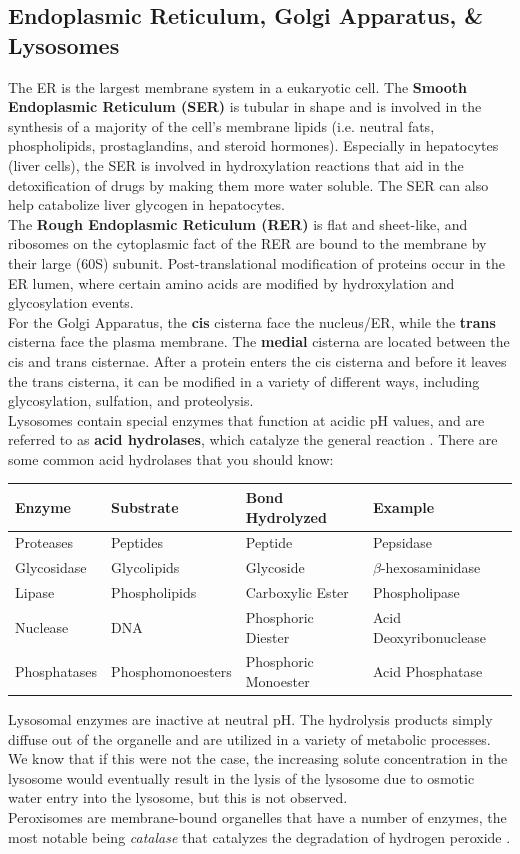 \documentclass{article}
\theoremstyle{plain}%
\theoremstyle{definition}
\theoremstyle{remark}
\begin{document}
\subsection{Endoplasmic Reticulum, Golgi Apparatus, \& Lysosomes}
The ER is the largest membrane system in a eukaryotic cell. The \textbf{Smooth Endoplasmic Reticulum (SER)} is tubular in shape and is involved in the synthesis of a majority of the cell's membrane lipids (i.e. neutral fats, phospholipids, prostaglandins, and steroid hormones). Especially in hepatocytes (liver cells), the SER is involved in hydroxylation reactions that aid in the detoxification of drugs by making them more water soluble. The SER can also help catabolize liver glycogen in hepatocytes.\\
\indent The \textbf{Rough Endoplasmic Reticulum (RER)} is flat and sheet-like, and ribosomes on the cytoplasmic fact of the RER are bound to the membrane by their large (60S) subunit. Post-translational modification of proteins occur in the ER lumen, where certain amino acids are modified by hydroxylation and glycosylation events. \\
\indent For the Golgi Apparatus, the \textbf{cis} cisterna face the nucleus/ER, while the \textbf{trans} cisterna face the plasma membrane. The \textbf{medial} cisterna are located between the cis and trans cisternae. After a protein enters the cis cisterna and before it leaves the trans cisterna, it can be modified in a variety of different ways, including glycosylation, sulfation, and proteolysis.\\
\indent Lysosomes contain special enzymes that function at acidic pH values, and are referred to as \textbf{acid hydrolases}, which catalyze the general reaction . There are some common acid hydrolases that you should know:
\begin{table}[h!]
\begin{tabular}{llll}
\hline
\textbf{Enzyme} & \textbf{Substrate} & \textbf{Bond Hydrolyzed} & \textbf{Example} \\
\hline
Proteases & Peptides & Peptide & Pepsidase\\
Glycosidase & Glycolipids & Glycoside & $\beta$-hexosaminidase\\
Lipase & Phospholipids  & Carboxylic Ester & Phospholipase\\
Nuclease & DNA & Phosphoric Diester & Acid Deoxyribonuclease\\
Phosphatases & Phosphomonoesters & Phosphoric Monoester & Acid Phosphatase\\
\hline      
\end{tabular}
\end{table}
\noindent Lysosomal enzymes are inactive at neutral pH. The hydrolysis products simply diffuse out of the organelle and are utilized in a variety of metabolic processes. We know that if this were not the case, the increasing solute concentration in the lysosome would eventually result in the lysis of the lysosome due to osmotic water entry into the lysosome, but this is not observed. \\
\indent Peroxisomes are membrane-bound organelles that have a number of enzymes, the most notable being \textit{catalase} that catalyzes the degradation of hydrogen peroxide .
\end{document}
